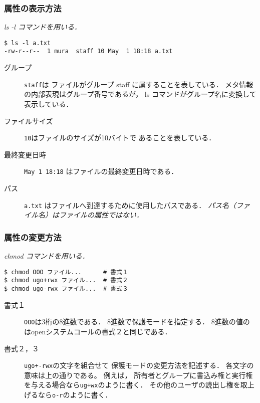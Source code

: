 \documentclass{beamer}                 %
\begin{document}
\begin{frame}[fragile]
  \frametitle{属性の表示方法}
  \emph{ls -l コマンドを用いる．}
  \begin{lstlisting}[numbers=none]
$ ls -l a.txt
-rw-r--r--  1 mura  staff 10 May  1 18:18 a.txt
  \end{lstlisting}
\begin{description}
\item[グループ] \texttt{staff}は
ファイルがグループ staff に属することを表している．
メタ情報の内部表現はグループ番号であるが，
ls コマンドがグループ名に変換して表示している．
\item[ファイルサイズ] \texttt{10}はファイルのサイズが10バイトで
あることを表している．
\item[最終変更日時] \texttt{May 1 18:18} はファイルの最終変更日時である．
\item[パス] \texttt{a.txt} はファイルへ到達するために使用したパスである．
\emph{パス名（ファイル名）はファイルの属性ではない．}
\end{description}
\end{frame}

\begin{frame}[fragile]
  \frametitle{属性の変更方法}
  \emph{chmod コマンドを用いる．}\\
  \begin{minipage}{0.48\columnwidth}
  \begin{lstlisting}[numbers=none]
$ chmod OOO ファイル...      # 書式１
$ chmod ugo+rwx ファイル...  # 書式２
$ chmod ugo-rwx ファイル...  # 書式３
  \end{lstlisting}
  \end{minipage}
  \begin{minipage}{0.48\columnwidth}
  \end{minipage}

\begin{description}
\item[書式１] \texttt{OOO}は3桁の8進数である．
8進数で保護モードを指定する．
8進数の値のはopenシステムコールの書式２と同じである．

\item[書式２，３] \texttt{ugo+-rwx}の文字を組合せて
保護モードの変更方法を記述する．
各文字の意味は上の通りである。
例えば，
所有者とグループに書込み権と実行権を与える場合なら\texttt{ug+wx}のように書く．
その他のユーザの読出し権を取上げるなら\texttt{o-r}のように書く．
\end{description}
\end{frame}
\end{document}
